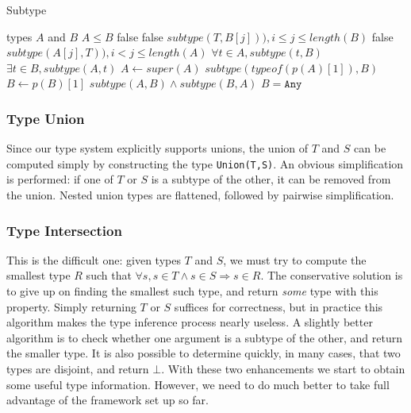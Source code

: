 \documentclass[9pt]{sigplanconf}
\begin{document}
\begin{algorithm}
\caption{Subtype}
\label{alg3}
\begin{algorithmic}
\REQUIRE types $A$ and $B$
\ENSURE $A \leq B$
  \RETURN false
 \ENDIF
    \RETURN false
   \ENDIF
   \RETURN $subtype(T,B[j])), i \leq j \leq length(B)$
   \RETURN false
   \RETURN $subtype(A[j],T)), i < j \leq length(A)$
  \ENDIF
 \ENDFOR
{}
 \RETURN $\forall t \in A, subtype(t,B)$
 \RETURN $\exists t \in B, subtype(A,t)$
\ENDIF
{}
 \ENDIF
 \STATE $A \leftarrow super(A)$
\ENDWHILE
{}
 \RETURN $subtype(typeof(p(A)[1]),B)$
 \STATE $B \leftarrow p(B)[1]$
 \RETURN $subtype(A,B) \land subtype(B,A)$
\ENDIF
\RETURN $B = \texttt{Any}$
\end{algorithmic}
\end{algorithm}


\subsubsection{Type Union}

Since our type system explicitly supports unions, the union of $T$ and
$S$ can be computed simply by constructing the type {\tt Union(T,S)}.
An obvious simplification is performed: if one of $T$ or $S$ is a
subtype of the other, it can be removed from the union. Nested union
types are flattened, followed by pairwise simplification.

\subsubsection{Type Intersection}

This is the difficult one: given types $T$ and $S$, we must try to compute
the smallest type $R$ such that
$\forall s, s \in T \land s \in S \Rightarrow s \in R$.
The conservative solution is to give up on finding the smallest such type, and
return \emph{some} type with this property. Simply returning $T$ or $S$
suffices for correctness, but in practice this algorithm
makes the type inference process nearly useless. A slightly better
algorithm is to check whether one argument is a subtype of the other, and
return the smaller type. It is also possible to determine quickly, in
many cases, that two types are disjoint, and return $\bot$. With these
two enhancements we start to obtain some useful type information. However,
we need to do much better to take full advantage of the framework set up
so far.
\end{document}
